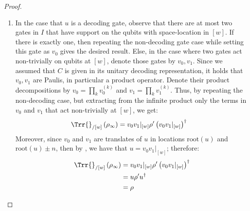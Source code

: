 \begin{proof}
\begin{enumerate}
\begin{enumerate}
 \begin{equation*}
   \begin{split}
   \Trr{}_{/[w]}\left( \rho_{\infty} \right) &= \Trr{}_{/[w]}\left( \prod_{j = -\infty}^{\infty} v_{j} \rho_{\infty}^{\prime} \prod_{j = -\infty}^{\infty} v_{j}^{\dagger} \right) \\ 
   &= v_{0}\Trr{}_{/[w]}\left( \prod_{j = -\infty, j \neq 0}^{\infty} v_{j} \rho_{\infty}^{\prime} \prod_{j = -\infty, j \neq 0}^{\infty} v_{j}^{\dagger} \right) v_{0}^{\dagger} \\
   &= v_{0}\Trr{}_{/[w]}\left( \prod_{j = -\infty, j \neq 0}^{\infty} v_{j}^{\dagger} \prod_{j = -\infty, j \neq 0}^{\infty} v_{j} \rho_{\infty}^{\prime} \right) v_{0}^{\dagger} \\
   &= v_{0}\Trr{}_{/[w]}\left( \rho_{\infty}^{\prime} \right) v_{0}^{\dagger} \\
   &= v_{0} \rho^{\prime} v_{0}^{\dagger} \\
   &= \rho 
   \end{split}
 \end{equation*}

 \item In the case that $u$ is a decoding gate, observe that there are at most two gates in $I$ that have support on the qubits with space-location in $[w]$. If there is exactly one, then repeating the non-decoding gate case while setting this gate as $v_{0}$ gives the desired result. 
Else, in the case where two gates act non-trivially on qubits at $[w]$, denote those gates by $v_{0}, v_{1}$. Since we assumed that $C$ is given in its unitary decoding representation, it holds that $v_{0}, v_{1}$ are Paulis, in particular a product operator. Denote their product decompositions by $v_{0} = \prod_{k}v_{0}^{(k)}$ and $v_{1} = \prod_{k}v_{1}^{(k)}$. Thus, by repeating the non-decoding case, but extracting from the infinite product only the terms in $v_{0}$ and $v_{1}$ that act non-trivially at $[w]$, we get:
   \begin{equation*}
     \begin{split}
       \Trr{}_{/[w]}\left( \rho_{\infty} \right) &= v_{0}v_{1}|_{[w]} \rho^{\prime} \left(v_{0}v_{1}|_{[w]}\right)^{\dagger} 
     \end{split}
   \end{equation*}
Moreover, since $v_{0}$ and $v_{1}$ are translates of $u$ in locations $\text{root}(u)$ and $\text{root}(u) \pm n$, then by , we have that $u = v_{0}v_{1}|_{[w]}$; therefore:
   \begin{equation*}
     \begin{split}
       \Trr{}_{/[w]}\left( \rho_{\infty} \right) &= v_{0}v_{1}|_{[w]} \rho^{\prime} \left(v_{0}v_{1}|_{[w]}\right)^{\dagger} \\
       &= u \rho^{\prime} u^{\dagger} \\
   &= \rho 
     \end{split}
   \end{equation*}
  \end{enumerate}
  \end{enumerate}
\end{proof}

